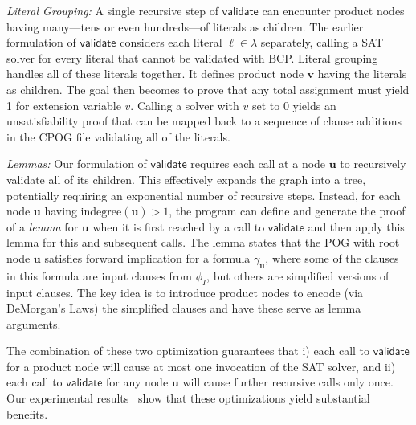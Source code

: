 \documentclass[letterpaper,USenglish,cleveref, autoref, thm-restate]{lipics-v2021}
\newcommand{\lit}{\ell}
\newcommand{\indegree}{\textrm{indegree}}
\newcommand{\validate}{\textsf{validate}}
\newcommand{\inputformula}{\phi_I}
\newcommand{\makenode}[1]{\mathbf{#1}}
\newcommand{\nodeu}{\makenode{u}}
\newcommand{\nodev}{\makenode{v}}
\begin{document}
\emph{Literal Grouping:} A single recursive step of $\validate$ can encounter product nodes
having many---tens or even hundreds---of literals as children.  The
earlier formulation of $\validate$ considers each literal $\lit \in \lambda$
separately, calling a SAT solver for every literal that cannot be
validated with BCP\@.  Literal grouping handles
all of these literals together.  It defines product node $\nodev$
having the literals as children.  The goal then becomes to prove that
any total assignment must yield 1 for extension variable $v$.  Calling
a solver with $v$ set to 0 yields an unsatisfiability proof that can
be mapped back to a sequence of clause additions in the CPOG file validating
all of the literals.

\emph{Lemmas:} Our formulation of $\validate$ requires each call at a
node $\nodeu$ to recursively validate all of its children.  This
effectively expands the graph into a tree, potentially requiring an
exponential number of recursive steps.  Instead, for each node
$\nodeu$ having $\indegree(\nodeu) > 1$, the program can define and
generate the proof of a \emph{lemma} for $\nodeu$ when it is first reached by
a call to $\validate$ and then apply this lemma for this and
subsequent calls.  The lemma states that the POG with root node
$\nodeu$ satisfies forward implication for a formula
$\gamma_{\nodeu}$, where some of the clauses in this formula are
input clauses from $\inputformula$, but others are simplified
versions of input clauses.
The key idea is to introduce product nodes to encode (via DeMorgan's
Laws) the simplified clauses and have these serve as lemma arguments.

The combination of these two optimization guarantees that i) each call
to $\validate$ for a product node will cause at most one invocation of
the SAT solver, and ii) each call to $\validate$ for any node $\nodeu$
will cause further recursive calls only once.  Our experimental
results~\cite{bryant:sat:2023:supplement} show that these
optimizations yield substantial benefits.



\end{document}
